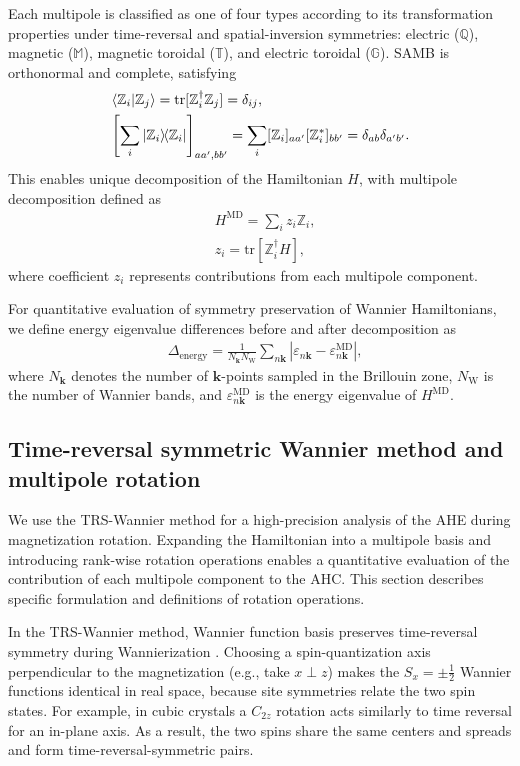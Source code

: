 \documentclass[preprint,12pt]{elsarticle}
\begin{document}
Each multipole is classified as one of four types according to its
transformation properties under time-reversal and spatial-inversion
symmetries: electric ($\mathbb{Q}$), magnetic ($\mathbb{M}$),
magnetic toroidal ($\mathbb{T}$), and electric toroidal ($\mathbb{G}$).
SAMB is orthonormal and complete, satisfying
\begin{align}
  & \braket{\mathbb{Z}_i}{\mathbb{Z}_j}
  =\mathrm{tr}[\mathbb{Z}_i^\dagger \mathbb{Z}_j] = \delta_{ij}, \\
  & \left[ \sum_i \ketbra{\mathbb{Z}_i}{\mathbb{Z}_i} \right]_{aa', bb'}
  = \sum_i [\mathbb{Z}_i]_{aa'} [\mathbb{Z}_i^*]_{bb'}
  = \delta_{ab} \delta_{a'b'}.
\end{align}
This enables unique decomposition of the Hamiltonian $H$, with
multipole decomposition defined as
\begin{align}
  & H^{\mathrm{MD}} = \sum_{i} z_i \mathbb{Z}_i, \\
  & z_i = \mathrm{tr} [\mathbb{Z}^\dagger_i H] ,
\end{align}
where coefficient $z_i$ represents contributions from each multipole component.

For quantitative evaluation of symmetry preservation of Wannier
Hamiltonians, we define energy eigenvalue differences before and
after decomposition as
\begin{align}
  & \Delta_{\mathrm{energy}}
  = \frac{1}{N_{\bm{k}} N_{\mathrm{W}}}
  \sum_{n\bm{k}}
  |\varepsilon_{n\bm{k}}
  - \varepsilon^{\mathrm{MD}}_{n\bm{k}}| ,
  \label{eq:delta_energy}
\end{align}
where $N_{\bm{k}}$ denotes the number of $\bm{k}$-points sampled in
the Brillouin zone, $N_{\mathrm{W}}$ is the number of Wannier bands,
and $\varepsilon^{\mathrm{MD}}_{n\bm{k}}$ is the energy eigenvalue of
$H^{\mathrm{MD}}$.

\subsection{Time-reversal symmetric Wannier method and multipole rotation}
\label{sec:trs-multipole}
We use the TRS-Wannier method for a high-precision analysis of
the AHE during magnetization rotation.
Expanding the Hamiltonian into a multipole basis and introducing
rank-wise rotation operations enables a quantitative evaluation of the
contribution of each multipole component to the AHC.
This section describes specific formulation and definitions of
rotation operations.

In the TRS-Wannier method, Wannier function basis preserves
time-reversal symmetry during Wannierization \cite{Saito2024-vw}.
Choosing a spin-quantization axis perpendicular to the magnetization
(e.g., take $x\perp z$) makes the $S_x=\pm\tfrac12$ Wannier functions
identical in real space, because site symmetries relate the two spin
states. For example, in cubic crystals a $C_{2z}$ rotation acts similarly to
time reversal for an in-plane axis. As a result, the two spins share
the same centers and spreads and form time-reversal-symmetric pairs.
\end{document}
